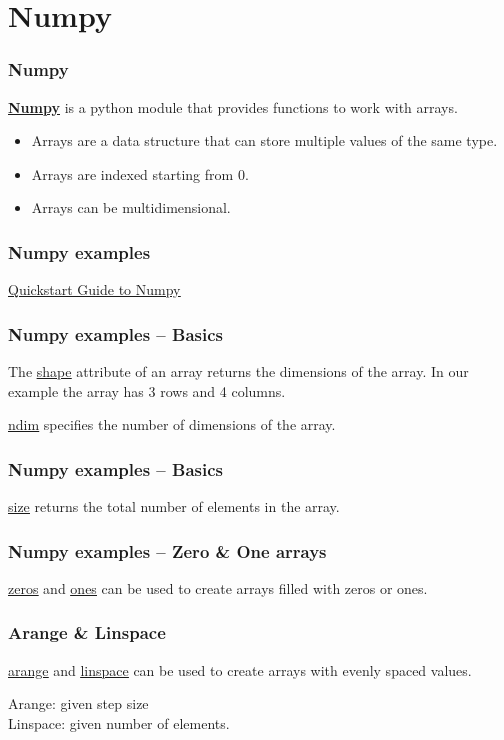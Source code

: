 \documentclass{beamer}
\newcommand{\hrefu}[2]{\underline{\href{#1}{#2}}}
\begin{document}
\section{Numpy}
\begin{frame}
  \frametitle{Numpy}
  \textbf{\hrefu{https://numpy.org/doc/}{Numpy}} is a python module that provides functions to work with arrays.
  \begin{itemize}
    \item Arrays are a data structure that can store multiple values of the same type.
    \item Arrays are indexed starting from 0.
    \item Arrays can be multidimensional.
  \end{itemize}
\end{frame}
\begin{frame}
  \frametitle{Numpy examples}
  \hrefu{https://numpy.org/doc/1.23/numpy-user.pdf}{Quickstart Guide to Numpy}
  
\end{frame}
\begin{frame}
  \frametitle{Numpy examples -- Basics}
  The \hrefu{https://numpy.org/doc/stable/reference/generated/numpy.ndarray.shape.html}{shape} attribute of an array returns the dimensions of the array. In our example the array has 3 rows and 4 columns.
  
  \hrefu{https://numpy.org/doc/stable/reference/generated/numpy.ndarray.ndim.html}{ndim} specifies the number of dimensions of the array.
  
\end{frame}
\begin{frame}
  \frametitle{Numpy examples -- Basics}
  \hrefu{https://numpy.org/doc/stable/reference/generated/numpy.ndarray.size.html}{size} returns the total number of elements in the array.
  
\end{frame}
\begin{frame}
  \frametitle{Numpy examples -- Zero \& One arrays}
  \hrefu{https://numpy.org/doc/stable/reference/generated/numpy.zeros.html}{zeros} and \hrefu{https://numpy.org/doc/stable/reference/generated/numpy.ones.html}{ones} can be used to create arrays filled with zeros or ones.
  
\end{frame}
\begin{frame}
    \frametitle{Arange \& Linspace}
    \hrefu{https://numpy.org/doc/stable/reference/generated/numpy.arange.html}{arange} and \hrefu{https://numpy.org/doc/stable/reference/generated/numpy.linspace.html}{linspace} can be used to create arrays with evenly spaced values.
    
    Arange: given step size\\
    Linspace: given number of elements.
\end{frame}
\end{document}
